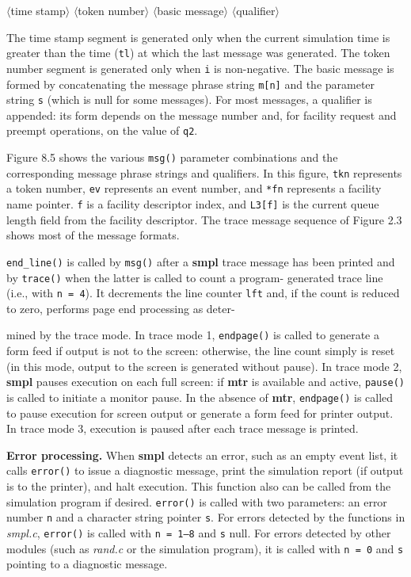 \begin{center}
$\langle$time stamp$\rangle$ $\langle$token number$\rangle$ $\langle$basic message$\rangle$ $\langle$qualifier$\rangle$
\end{center}

The time stamp segment is generated only when the current simulation time
is greater than the time (\texttt{tl}) at which the last message was generated. The
token number segment is generated only when \texttt{i} is non-negative. The basic
message is formed by concatenating the message phrase string \texttt{m[n]} and the
parameter string \texttt{s} (which is null for some messages). For most messages, a
qualifier is appended: its form depends on the message number and, for
facility request and preempt operations, on the value of \texttt{q2}.

Figure 8.5 shows the various \texttt{msg()} parameter combinations and the
corresponding message phrase strings and qualifiers. In this figure, \texttt{tkn}
represents a token number, \texttt{ev} represents an event number, and \texttt{*fn} represents
a facility name pointer. \texttt{f} is a facility descriptor index, and \texttt{L3[f]} is the
current queue length field from the facility descriptor. The trace message
sequence of Figure 2.3 shows most of the message formats.

\texttt{end\_line()} is called by \texttt{msg()} after a \textbf{smpl} trace message has been
printed and by \texttt{trace()} when the latter is called to count a program-
generated trace line (i.e., with \texttt{n = 4}). It decrements the line counter \texttt{lft}
and, if the count is reduced to zero, performs page end processing as \mbox{deter-}


\noindent mined by the trace mode. In trace mode 1, \texttt{endpage()} is called to generate a
form feed if output is not to the screen: otherwise, the line count simply is
reset (in this mode, output to the screen is generated without pause). In trace
mode 2, \textbf{smpl} pauses execution on each full screen: if \textbf{mtr} is available and
active, \texttt{pause()} is called to initiate a monitor pause. In the absence of \textbf{mtr},
\texttt{endpage()} is called to pause execution for screen output or generate a form
feed for printer output. In trace mode 3, execution is paused after each trace
message is printed.

\textbf{Error processing.} When \textbf{smpl} detects an error, such as an empty event list,
it calls \texttt{error()} to issue a diagnostic message, print the simulation report (if
output is to the printer), and halt execution. This function also can be called
from the simulation program if desired. \texttt{error()} is called with two parameters:
an error number \texttt{n} and a character string pointer \texttt{s}. For errors detected
by the functions in \textit{smpl.c}, \texttt{error()} is called with \texttt{n = 1--8} and \texttt{s} null. For
errors detected by other modules (such as \textit{rand.c} or the simulation program),
it is called with \texttt{n = 0} and \texttt{s} pointing to a diagnostic message.

